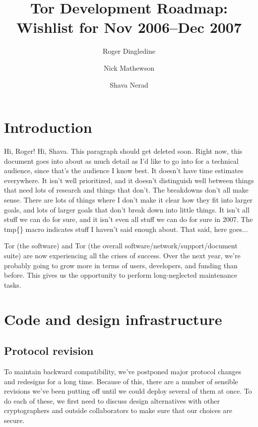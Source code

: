 \documentclass{article}
\begin{document}
\title{Tor Development Roadmap: Wishlist for Nov 2006--Dec 2007}
\author{Roger Dingledine \and Nick Mathewson \and Shava Nerad}

\maketitle
\pagestyle{plain}



\section{Introduction}
Hi, Roger!  Hi, Shava.  This paragraph should get deleted soon.  Right now,
this document goes into about as much detail as I'd like to go into for a
technical audience, since that's the audience I know best.  It doesn't have
time estimates everywhere.  It isn't well prioritized, and it doesn't
distinguish well between things that need lots of research and things that
don't.  The breakdowns don't all make sense.  There are lots of things where
I don't make it clear how they fit into larger goals, and lots of larger
goals that don't break down into little things. It isn't all stuff we can do
for sure, and it isn't even all stuff we can do for sure in 2007.  The
tmp\{\} macro indicates stuff I haven't said enough about.  That said, here
goes...

Tor (the software) and Tor (the overall software/network/support/document
suite) are now experiencing all the crises of success.  Over the next year,
we're probably going to grow more in terms of users, developers, and funding
than before.  This gives us the opportunity to perform long-neglected
maintenance tasks.

\section{Code and design infrastructure}

\subsection{Protocol revision}
To maintain backward compatibility, we've postponed major protocol
changes and redesigns for a long time.  Because of this, there are a number
of sensible revisions we've been putting off until we could deploy several of
them at once.  To do each of these, we first need to discuss design
alternatives with other cryptographers and outside collaborators to
make sure that our choices are secure.
\end{document}
